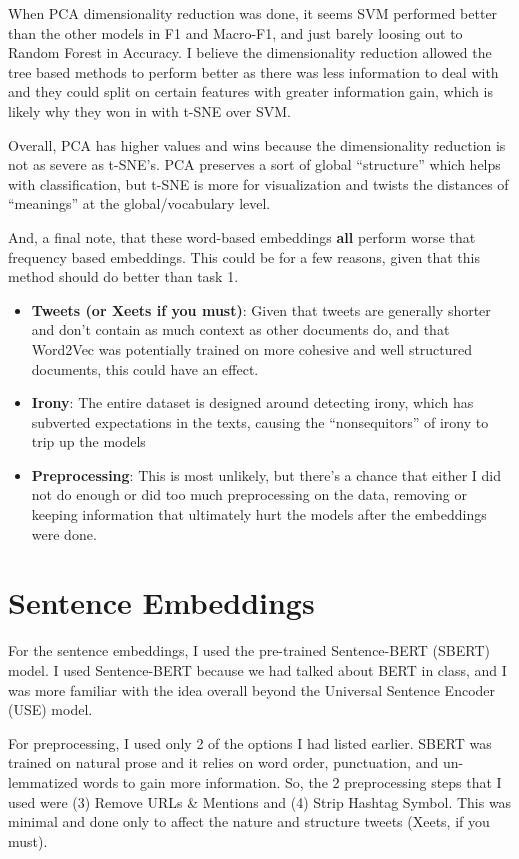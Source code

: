 \documentclass[12pt]{article}
\begin{document}
When PCA dimensionality reduction was done, it seems SVM performed better than the other models in F1 and Macro-F1, 
and just barely loosing out to Random Forest in Accuracy. I believe the dimensionality reduction allowed the 
tree based methods to perform better as there was less information to deal with and they could split on 
certain features with greater information gain, which is likely why they won in with t-SNE over SVM. 

Overall, PCA has higher values and wins because the dimensionality reduction is not as severe as t-SNE's. 
PCA preserves a sort of global ``structure'' which helps with classification, but t-SNE is more for 
visualization and twists the distances of ``meanings'' at the global/vocabulary level.

And, a final note, that these word-based embeddings \textbf{all} perform worse that frequency based embeddings. 
This could be for a few reasons, given that this method should do better than task 1. 

\begin{itemize}
    \item \textbf{Tweets (or Xeets if you must)}: Given that tweets are generally shorter and don't contain as much context as 
    other documents do, and that Word2Vec was potentially trained on more cohesive and well structured documents,
    this could have an effect.
    \item \textbf{Irony}: The entire dataset is designed around detecting irony, which has subverted 
    expectations in the texts, causing the ``nonsequitors'' of irony to trip up the models
    \item \textbf{Preprocessing}: This is most unlikely, but there's a chance that either I did 
    not do enough or did too much preprocessing on the data, removing or keeping information 
    that ultimately hurt the models after the embeddings were done.
\end{itemize}

\section{Sentence Embeddings} \label{sentence_embed}

For the sentence embeddings, I used the pre-trained Sentence-BERT (SBERT) model. I used Sentence-BERT because we 
had talked about BERT in class, and I was more familiar with the idea overall beyond the 
Universal Sentence Encoder (USE) model.

For preprocessing, I used only 2 of the options I had listed earlier. SBERT was trained on 
natural prose and it relies on word order, punctuation, and un-lemmatized words to gain more information.
So, the 2 preprocessing steps that I used were (3) Remove URLs \& Mentions and (4) Strip Hashtag Symbol. This 
was minimal and done only to affect the nature and structure tweets (Xeets, if you must).
\end{document}
